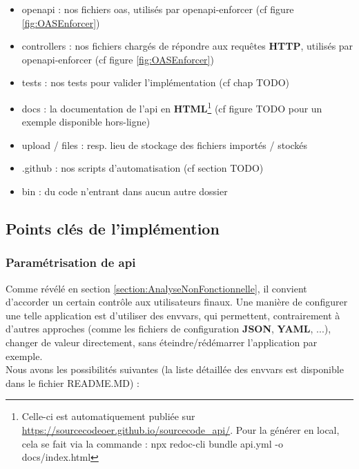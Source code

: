 \begin{itemize}
    \item openapi : nos fichiers \Gls{oas}, utilisés par openapi-enforcer (cf figure \ref{fig:OASEnforcer})
    \item controllers : nos fichiers chargés de répondre aux requêtes \textbf{HTTP}, utilisés par openapi-enforcer (cf figure \ref{fig:OASEnforcer})
    \item tests : nos tests pour valider l'implémentation (cf chap TODO)
    \item docs : la documentation de l'\Gls{api} en \textbf{HTML}\footnote{
        Celle-ci est automatiquement publiée sur 
        \href{https://sourcecodeoer.github.io/sourcecode\_api/}{https://sourcecodeoer.github.io/sourcecode\_api/}.
        Pour la générer en local, cela se fait via la commande : 
        npx redoc-cli bundle api.yml -o docs/index.html 
    } (cf figure TODO pour un exemple disponible hors-ligne)
    \item upload / files : resp. lieu de stockage des fichiers importés / stockés 
    \item .github : nos scripts d'automatisation (cf section TODO) 
    \item bin : du code n'entrant dans aucun autre dossier
\end{itemize}

\pagebreak
\subsection{Points clés de l'implémention}

\subsubsection{Paramétrisation de \Gls{api}}

Comme révélé en section \ref{section:AnalyseNonFonctionnelle}, il convient d'accorder un certain contrôle aux utilisateurs finaux.
Une manière de configurer une telle application est d'utiliser des \glspl{envvar}, 
qui permettent, contrairement à d'autres approches (comme les fichiers de configuration \textbf{JSON}, \textbf{YAML}, ...), 
changer de valeur directement, sans éteindre/rédémarrer l'application par exemple. \\

Nous avons les possibilités suivantes (la liste détaillée des \glspl{envvar} est disponible dans le fichier README.MD) :

